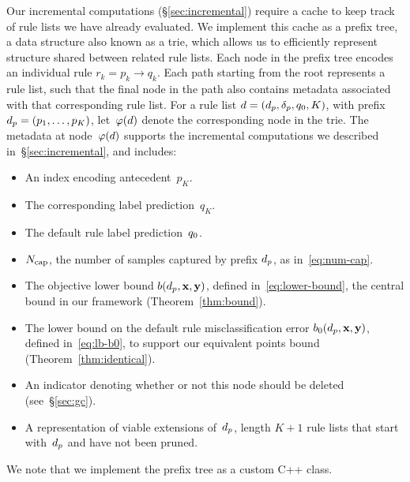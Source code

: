 Our incremental computations (\S\ref{sec:incremental}) require a
cache to keep track of rule lists we have already evaluated.
%
We implement this cache as a prefix tree, a data structure also known as a trie,
which allows us to efficiently represent structure shared between related rule lists.
%
Each node in the prefix tree encodes an individual rule ${r_k = p_k \rightarrow q_k}$.
%
Each path starting from the root represents a rule list, such that the final node
in the path also contains metadata associated with that corresponding rule list.
%
For a rule list ${{d} = (d_p, \delta_p, q_0, K)}$,
with prefix ${d_p = (p_1, \dots, p_K)}$,
let~$\varphi({d})$ denote the corresponding node in the trie.
%
The metadata at node~$\varphi({d})$ supports the incremental computations
we described in~\S\ref{sec:incremental}, and includes:
\begin{itemize}
\item An index encoding antecedent~$p_K$.
\item The corresponding label prediction~$q_K$.
\item The default rule label prediction~$q_0$.
\item $N_{\textnormal{cap}}$, the number of samples captured by prefix $d_p$, as in~\eqref{eq:num-cap}. %
\item The objective lower bound $b(d_p, \mathbf{x}, \mathbf{y})$, defined in~\eqref{eq:lower-bound},
  the central bound in our framework (Theorem~\ref{thm:bound}).
\item The lower bound on the default rule misclassification error
  $b_0(d_p, \mathbf{x}, \mathbf{y})$, defined in~\eqref{eq:lb-b0},
  to support our equivalent points bound (Theorem~\ref{thm:identical}).
\item An indicator denoting whether or not this node should be deleted (see~\S\ref{sec:gc}).
\item A representation of viable extensions of~$d_p$,
  \ie length ${K+1}$ rule lists that start with~$d_p$ and have not been pruned.
\end{itemize}
We note that we implement the prefix tree as a custom C++ class. %
%
%

